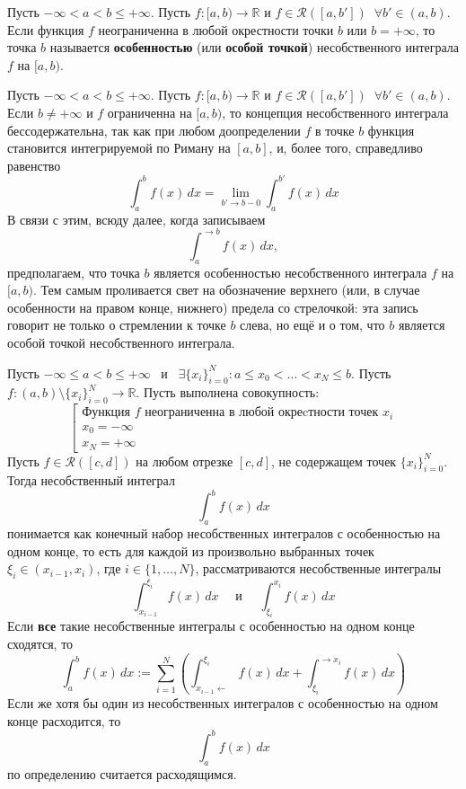 \documentclass[11pt]{article}
\begin{document}
\begin{definition}
    Пусть $- \infty < a < b \leq + \infty$. Пусть $f \colon [a, b) \to \mathbb{R}$ и $f \in \mathcal{R}([a, b']) \; \; \forall b' \in (a, b)$. Если функция $f$ неограниченна в любой окрестности точки $b$ или $b = + \infty$, то точка $b$ называется \textbf{особенностью} (или \textbf{особой точкой}) несобственного интеграла $f$ на $[a, b)$. 
\end{definition}

\begin{remark}
    Пусть $- \infty < a < b \leq + \infty$. Пусть $f \colon [a, b) \to \mathbb{R}$ и $f \in \mathcal{R}([a, b']) \; \; \forall b' \in (a, b)$. Если $b \neq + \infty$ и $f$ ограниченна на $[a, b)$, то концепция несобственного интеграла бессодержательна, так как при любом доопределении $f$ в точке $b$ функция становится интегрируемой по Риману на $[a, b]$, и, более того, справедливо равенство
    \[\int_{a}^{b} f(x) \, dx = \lim_{b' \to b - 0} \int_{a}^{b'} f(x) \, dx\]
    В связи с этим, всюду далее, когда записываем 
    \[\int_{a}^{\to b} f(x) \, dx,\]
    предполагаем, что точка $b$ является особенностью несобственного интеграла $f$ на $[a, b)$. Тем самым проливается свет на обозначение верхнего (или, в случае особенности на правом конце, нижнего) предела со стрелочкой: эта запись говорит не только о стремлении к точке $b$ слева, но ещё и о том, что $b$ является особой точкой несобственного интеграла.
\end{remark}

\begin{definition}
    Пусть $- \infty \leq a < b \leq + \infty$ \, и \, $\exists \{x_i\}_{i = 0}^N: a \leq x_0 < \ldots < x_N \leq b$. Пусть $f \colon (a, b) \setminus \{x_i\}_{i = 0}^N \to \mathbb{R}$. Пусть выполнена совокупность:
    \[
    \left[
    \begin{array}{l}
    \text{Функция } f \text{ неограниченна в любой окреcтности точек } x_i \\
    x_0 = - \infty \\
    x_N = + \infty
    \end{array}
    \right.
    \]
    Пусть $f \in \mathcal{R}([c, d])$ на любом отрезке $[c, d]$, не содержащем точек $\{x_i\}_{i = 0}^N$. Тогда несобственный интеграл 
    \[\int_{a}^{b} f(x) \, dx\]
    понимается как конечный набор несобственных интегралов с особенностью на одном конце, то есть для каждой из произвольно выбранных точек $\xi_i \in (x_{i - 1}, x_i)$, где $i \in \{1, \ldots, N\}$, рассматриваются несобственные интегралы
    \[\int_{x_{i - 1}}^{\xi_i} f(x) \, dx \quad \text{ и } \quad \int_{\xi_i}^{x_i} f(x) \, dx\]
    Если \textbf{все} такие несобственные интегралы с особенностью на одном конце сходятся, то 
    \[ \int_{a}^{b} f(x) \, dx := \sum_{i = 1}^{N} \left(\int_{x_{i - 1} \leftarrow}^{\xi_i} f(x) \, dx + \int_{\xi_i}^{\to x_i} f(x) \, dx\right)\]
    Если же хотя бы один из несобственных интегралов с особенностью на одном конце расходится, то 
    \[\int_{a}^{b} f(x) \, dx\]
    по определению считается расходящимся.
\end{definition}
\end{document}
